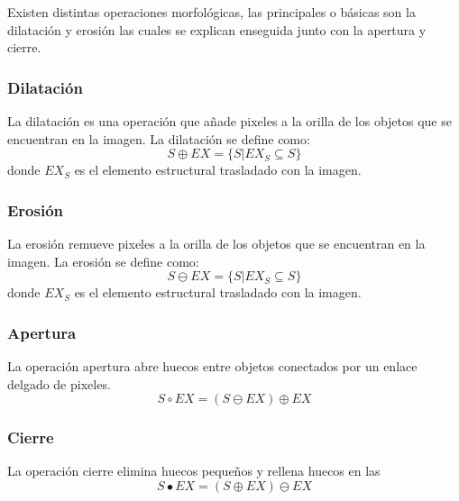 Existen distintas operaciones morfológicas, las principales o básicas son la dilatación y erosión las cuales se explican enseguida junto con la apertura y cierre. 
 
\subsubsection{Dilatación}\label{sssec:Dilatation}

La dilatación es una operación que añade pixeles a la orilla de los objetos que se encuentran en la imagen. La dilatación se define como:  
$$S \oplus EX = \lbrace S|EX_S \subseteq S \rbrace$$  
donde $EX_S$ es el elemento estructural trasladado con la imagen. 

\subsubsection{Erosión}\label{sssec:OMerosion}

La erosión remueve pixeles a la orilla de los objetos que se encuentran en la imagen. La erosión se define como: 
$$S \ominus EX = \lbrace S|EX_S \subseteq S \rbrace$$ 
donde $EX_S$ es el elemento estructural trasladado con la imagen. 

\subsubsection{Apertura}\label{sssec:Opening} 

La operación apertura abre huecos entre objetos conectados por un enlace delgado de pixeles.  
$$S \circ EX = (S \ominus EX) \oplus EX $$

\subsubsection{Cierre}\label{sssec:Closure}

La operación cierre elimina huecos pequeños  y rellena huecos en las
$$S \bullet EX = (S \oplus EX) \ominus EX $$


